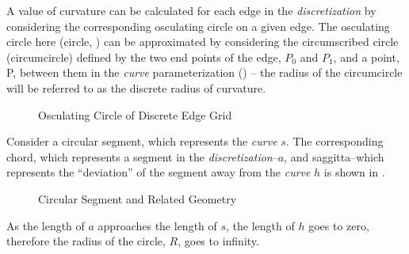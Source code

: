 A value of curvature can be calculated for each edge in the \textit{discretization} by considering the corresponding osculating circle on a given edge. The osculating circle here (circle, ) can be approximated by considering the circumscribed circle (circumcircle) \cite{casey1888} defined by the two end points of the edge, $P_0$ and $P_1$, and a point, P, between them in the \textit{curve} parameterization () -- the radius of the circumcircle will be referred to as the discrete radius of curvature.

\begin{figure}[h!]
  \caption{\label{fig:CircumscribedCircle} Osculating Circle of Discrete Edge Grid}
\end{figure}


Consider a circular segment, which represents the \textit{curve} $s$.  The corresponding chord, which represents a segment in the \textit{discretization}--$a$, and saggitta--which represents the ``deviation'' of the segment away from the \textit{curve} $h$ is shown in .

\begin{figure}
  \caption{\label{fig:CircleGeometry} Circular Segment and Related Geometry \cite{weissteineSagitta}}
\end{figure}

\begin{theorem}
As the length of $a$ approaches the length of $s$, the length of $h$ goes 
to zero, therefore the radius of the circle, $R$, goes to infinity.  
\end{theorem}

